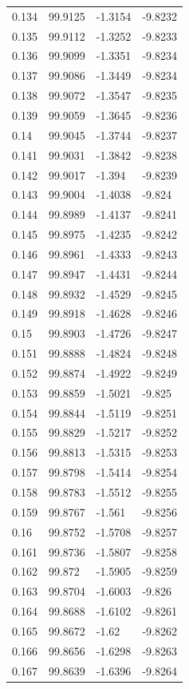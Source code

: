 \begin{tabular}{llll}
0.134 & 99.9125 & -1.3154 & -9.8232 \\
0.135 & 99.9112 & -1.3252 & -9.8233 \\
0.136 & 99.9099 & -1.3351 & -9.8234 \\
0.137 & 99.9086 & -1.3449 & -9.8234 \\
0.138 & 99.9072 & -1.3547 & -9.8235 \\
0.139 & 99.9059 & -1.3645 & -9.8236 \\
0.14 & 99.9045 & -1.3744 & -9.8237 \\
0.141 & 99.9031 & -1.3842 & -9.8238 \\
0.142 & 99.9017 & -1.394 & -9.8239 \\
0.143 & 99.9004 & -1.4038 & -9.824 \\
0.144 & 99.8989 & -1.4137 & -9.8241 \\
0.145 & 99.8975 & -1.4235 & -9.8242 \\
0.146 & 99.8961 & -1.4333 & -9.8243 \\
0.147 & 99.8947 & -1.4431 & -9.8244 \\
0.148 & 99.8932 & -1.4529 & -9.8245 \\
0.149 & 99.8918 & -1.4628 & -9.8246 \\
0.15 & 99.8903 & -1.4726 & -9.8247 \\
0.151 & 99.8888 & -1.4824 & -9.8248 \\
0.152 & 99.8874 & -1.4922 & -9.8249 \\
0.153 & 99.8859 & -1.5021 & -9.825 \\
0.154 & 99.8844 & -1.5119 & -9.8251 \\
0.155 & 99.8829 & -1.5217 & -9.8252 \\
0.156 & 99.8813 & -1.5315 & -9.8253 \\
0.157 & 99.8798 & -1.5414 & -9.8254 \\
0.158 & 99.8783 & -1.5512 & -9.8255 \\
0.159 & 99.8767 & -1.561 & -9.8256 \\
0.16 & 99.8752 & -1.5708 & -9.8257 \\
0.161 & 99.8736 & -1.5807 & -9.8258 \\
0.162 & 99.872 & -1.5905 & -9.8259 \\
0.163 & 99.8704 & -1.6003 & -9.826 \\
0.164 & 99.8688 & -1.6102 & -9.8261 \\
0.165 & 99.8672 & -1.62 & -9.8262 \\
0.166 & 99.8656 & -1.6298 & -9.8263 \\
0.167 & 99.8639 & -1.6396 & -9.8264 \\

\end{tabular}
